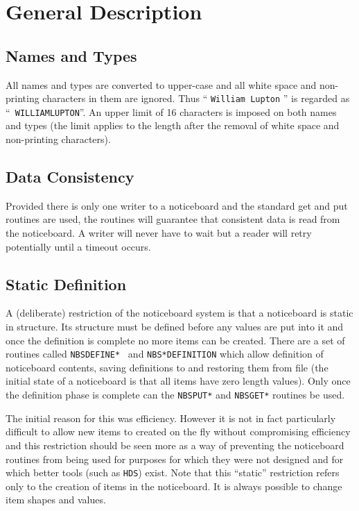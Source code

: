 \documentclass[twoside,11pt]{article}
\renewcommand{\_}{\texttt{\symbol{95}}}
\begin{document}
      \section {General Description}
      \subsection {Names and Types} All names and types are converted to
      upper-case and all white space and non-printing characters in them are
      ignored. Thus `` {\tt William Lupton} '' is regarded as ``{\tt%
WILLIAMLUPTON}''. An
      upper limit of 16 characters is imposed on both names and types (the
      limit applies to the length after the removal of white space and
      non-printing characters).

      \subsection {Data Consistency} Provided there is only one writer to a
      noticeboard and the standard get and put routines are used, the routines
      will guarantee that consistent data is read from the noticeboard. A
      writer will never have to wait but a reader will retry potentially until
      a timeout occurs.

      \subsection {Static Definition} A (deliberate) restriction of the
      noticeboard system is that a noticeboard is static in structure. Its
      structure must be defined before any values are put into it and once the
      definition is complete no more items can be created. There are a set of
      routines called {\tt NBS\_DEFINE\_* } and {\tt NBS\_*\_DEFINITION}
      which allow definition
      of noticeboard contents, saving definitions to and restoring them from
      file (the initial state of a noticeboard is that all items have zero
      length values). Only once the definition phase is complete can the
      {\tt NBS\_PUT\_*} and {\tt NBS\_GET\_*} routines be used.

      The initial reason for this was efficiency. However it is not in fact
      particularly difficult to allow new items to created on the fly without
      compromising efficiency and this restriction should be seen more as a way
      of preventing the noticeboard routines from being used for purposes for
      which they were not designed and for which better tools (such as
      {\tt HDS}) exist. Note that this ``static'' restriction refers only to
      the creation of
      items in the noticeboard. It is always possible to change item shapes and
      values.
\end{document}
